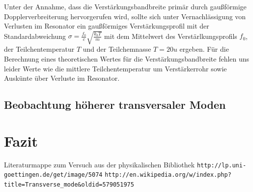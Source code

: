 \documentclass[bigchapter,colorback,accentcolor=tud4b,linedtoc,11pt]{tudreport}
\numberwithin{equation}{subsection}
\begin{document}
Unter der Annahme, dass die Verstärkungsbandbreite primär durch gaußförmige Dopplerverbreiterung hervorgerufen wird, sollte sich unter Vernachlässigung von Verlusten im Resonator ein gaußförmiges Verstärkungsprofil mit der Standardabweichung $\sigma = \frac{f_0}{c}\sqrt{\frac{k_b T}{m}}$ mit dem Mittelwert des Verstärlkungsprofils $f_0$, der Teilchentemperatur $T$ und der Teilchemnasse $T=20u$ ergeben. Für die Berechnung eines theoretischen Wertes für die Verstärkungsbandbreite fehlen uns leider Werte wie die mittlere Teilchentemperatur um Verstärkerrohr sowie Auskünte über Verluste im Resonator.

\section{Beobachtung höherer transversaler Moden}

\chapter{Fazit}



\cleardoublepage{}

\newpage

\begin{thebibliography}{100}
   Literaturmappe zum Versuch aus der physikalischen Bibliothek
   \verb|http://lp.uni-goettingen.de/get/image/5074|
   \verb|http://en.wikipedia.org/w/index.php?title=Transverse_mode&oldid=579051975|
\end{thebibliography}

\cleardoublepage{}
\listoffigures
\end{document}
